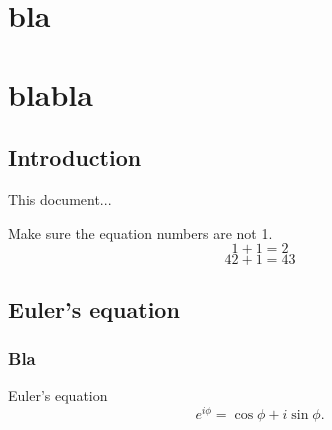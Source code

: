 \documentclass{book}
\begin{document}
\chapter{bla}
\chapter{blabla}
\section{Introduction}

This document...

Make sure the equation numbers are not 1.
\begin{equation}
  1+1=2
  \label{eqn:foo}
\end{equation}
\begin{equation}
  42+1=43
  \label{eqn:bar}
\end{equation}

\section{Euler's equation}
\subsection{Bla}
\label{sec:euler}

Euler's equation
\begin{equation}
  e^{i\phi} = \cos\phi + i\sin\phi.
  \label{eqn:euler}
\end{equation}
\end{document}
